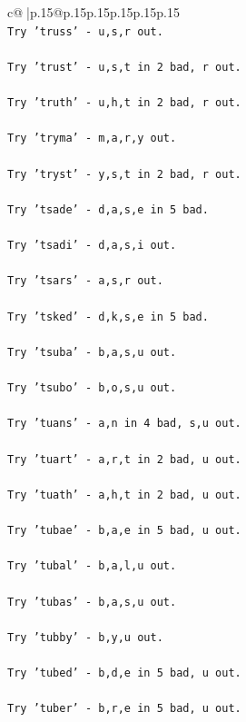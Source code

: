 \documentclass{article}
\begin{document}
{\begin{supertabular}{c@{$\;$}|p{.15\linewidth}@{}p{.15\linewidth}p{.15\linewidth}p{.15\linewidth}p{.15\linewidth}p{.15\linewidth}}
{{{\\ 
\texttt{Try 'truss' {-} u,s,r out.} \\
\\ 
\texttt{Try 'trust' {-} u,s,t in 2 bad, r out.} \\
\\ 
\texttt{Try 'truth' {-} u,h,t in 2 bad, r out.} \\
\\ 
\texttt{Try 'tryma' {-} m,a,r,y out.} \\
\\ 
\texttt{Try 'tryst' {-} y,s,t in 2 bad, r out.} \\
\\ 
\texttt{Try 'tsade' {-} d,a,s,e in 5 bad.} \\
\\ 
\texttt{Try 'tsadi' {-} d,a,s,i out.} \\
\\ 
\texttt{Try 'tsars' {-} a,s,r out.} \\
\\ 
\texttt{Try 'tsked' {-} d,k,s,e in 5 bad.} \\
\\ 
\texttt{Try 'tsuba' {-} b,a,s,u out.} \\
\\ 
\texttt{Try 'tsubo' {-} b,o,s,u out.} \\
\\ 
\texttt{Try 'tuans' {-} a,n in 4 bad, s,u out.} \\
\\ 
\texttt{Try 'tuart' {-} a,r,t in 2 bad, u out.} \\
\\ 
\texttt{Try 'tuath' {-} a,h,t in 2 bad, u out.} \\
\\ 
\texttt{Try 'tubae' {-} b,a,e in 5 bad, u out.} \\
\\ 
\texttt{Try 'tubal' {-} b,a,l,u out.} \\
\\ 
\texttt{Try 'tubas' {-} b,a,s,u out.} \\
\\ 
\texttt{Try 'tubby' {-} b,y,u out.} \\
\\ 
\texttt{Try 'tubed' {-} b,d,e in 5 bad, u out.} \\
\\ 
\texttt{Try 'tuber' {-} b,r,e in 5 bad, u out.} \\
\\ 
}}}
\end{supertabular}}
\end{document}
